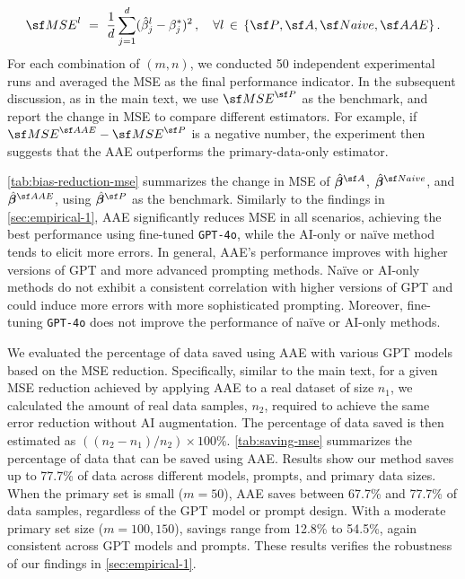 \begin{equation*}
    {\sf MSE}^l ~=~ \frac{1}{d}\sum_{j=1}^d (\hat{\beta}^l_j - \beta^*_j)^2 \,,~~~ \forall l \,\in\, \{{\sf P}, {\sf A}, {\sf Naive}, {\sf AAE}\}\,.
\end{equation*}
For each combination of $(m, n)$, we conducted 50 independent experimental runs and averaged the MSE as the final performance indicator. In the subsequent discussion, as in the main text, we use ${\sf MSE}^{\sf P}$ as the benchmark, and report the change in MSE to compare different estimators. For example, if ${\sf MSE}^{\sf AAE} - {\sf MSE}^{\sf P}$ is a negative number, the experiment then suggests that the AAE outperforms the primary-data-only estimator. 

\cref{tab:bias-reduction-mse} summarizes the change in MSE of $\hat{\betavec}^{\sf A}$, $\hat{\betavec}^{\sf Naive}$, and $\hat{\betavec}^{\sf AAE}$, using $\hat{\betavec}^{\sf P}$ as the benchmark. Similarly to the findings in \cref{sec:empirical-1}, AAE significantly reduces MSE in all scenarios, achieving the best performance using fine-tuned \texttt{GPT-4o}, while the AI-only or na\"ive method tends to elicit more errors.
In general, AAE's performance improves with higher versions of GPT and more advanced prompting methods. Na\"ive or AI-only methods do not exhibit a consistent correlation with higher versions of GPT and could induce more errors with more sophisticated prompting. Moreover, fine-tuning \texttt{GPT-4o} does not improve the performance of na\"ive or AI-only methods. 



We evaluated the percentage of data saved using AAE with various GPT models based on the MSE reduction. Specifically, similar to the main text, for a given MSE reduction achieved by applying AAE to a real dataset of size $n_1$, we calculated the amount of real data samples, $n_2$, required to achieve the same error reduction without AI augmentation. The percentage of data saved is then estimated as $((n_2 - n_1)/n_2) \times 100\%$. \cref{tab:saving-mse} summarizes the percentage of data that can be saved using AAE. Results show our method saves up to 77.7\% of data across different models, prompts, and primary data sizes. When the primary set is small ($m=50$), AAE saves between 67.7\% and 77.7\% of data samples, regardless of the GPT model or prompt design. With a moderate primary set size ($m=100, 150$), savings range from 12.8\% to 54.5\%, again consistent across GPT models and prompts. These results verifies the robustness of our findings in \cref{sec:empirical-1}.


